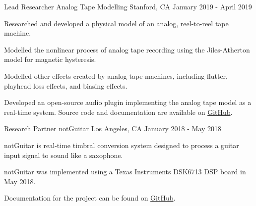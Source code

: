 \begin{cventries}
  \cventry
    {Lead Researcher} %
    {Analog Tape Modelling} %
    {Stanford, CA} %
    {January 2019 - April 2019} %
    {
        \begin{cvitems}
              \item{Researched and developed a physical model of an analog, reel-to-reel tape machine.}
              \item{Modelled the nonlinear process of analog tape recording using the Jiles-Atherton model for magnetic hysteresis.}
              \item{Modelled other effects created by analog tape machines, including flutter, playhead loss effects, and biasing effects.}
              \item{Developed an open-source audio plugin implementing the analog tape model as a real-time system.
                    Source code and documentation are available on \href{https://github.com/jatinchowdhury18/AnalogTapeModel}{GitHub}.}
        \end{cvitems}
    }


  \cventry
    {Research Partner} %
    {notGuitar} %
    {Los Angeles, CA} %
    {January 2018 - May 2018} %
    {
      \begin{cvitems} %
        \item {notGuitar is real-time timbral conversion system designed to process a guitar input signal to sound like a saxophone.}
        \item {notGuitar was implemented using a Texas Instruments DSK6713 DSP board in May 2018.}
        \item {Documentation for the project can be found on \href{https://github.com/jatinchowdhury18/notGuitar}{GitHub}.}
      \end{cvitems}
    }

\end{cventries}
